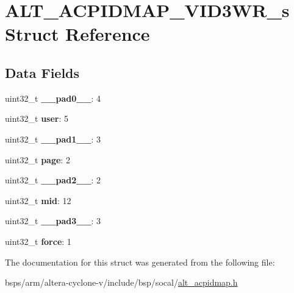 \hypertarget{structALT__ACPIDMAP__VID3WR__s}{}\section{A\+L\+T\+\_\+\+A\+C\+P\+I\+D\+M\+A\+P\+\_\+\+V\+I\+D3\+W\+R\+\_\+s Struct Reference}
\label{structALT__ACPIDMAP__VID3WR__s}
\subsection*{Data Fields}
\begin{DoxyCompactItemize}
\item 
\mbox{\label{structALT__ACPIDMAP__VID3WR__s_ab7fb7b8e96122f83da56fe8c8778306a}} 
uint32\+\_\+t {\bfseries \+\_\+\+\_\+pad0\+\_\+\+\_\+}\+: 4
\item 
\mbox{\label{structALT__ACPIDMAP__VID3WR__s_a0253413ff16c892275b11188e5b7b197}} 
uint32\+\_\+t {\bfseries user}\+: 5
\item 
\mbox{\label{structALT__ACPIDMAP__VID3WR__s_a83d681de9c1321d502ea57e27517a616}} 
uint32\+\_\+t {\bfseries \+\_\+\+\_\+pad1\+\_\+\+\_\+}\+: 3
\item 
\mbox{\label{structALT__ACPIDMAP__VID3WR__s_a7eca5110e2fd4ebc4843ea308a895307}} 
uint32\+\_\+t {\bfseries page}\+: 2
\item 
\mbox{\label{structALT__ACPIDMAP__VID3WR__s_a97bcd883f78f2c5aad835d1e86791a27}} 
uint32\+\_\+t {\bfseries \+\_\+\+\_\+pad2\+\_\+\+\_\+}\+: 2
\item 
\mbox{\label{structALT__ACPIDMAP__VID3WR__s_ae1c18e911039f456640c697192d9db48}} 
uint32\+\_\+t {\bfseries mid}\+: 12
\item 
\mbox{\label{structALT__ACPIDMAP__VID3WR__s_a7baf575463a43a19d6c3d5489f387c34}} 
uint32\+\_\+t {\bfseries \+\_\+\+\_\+pad3\+\_\+\+\_\+}\+: 3
\item 
\mbox{\label{structALT__ACPIDMAP__VID3WR__s_a306623d3042cf19226a25db85bbb5612}} 
uint32\+\_\+t {\bfseries force}\+: 1
\end{DoxyCompactItemize}


The documentation for this struct was generated from the following file\+:\begin{DoxyCompactItemize}
\item 
bsps/arm/altera-\/cyclone-\/v/include/bsp/socal/\mbox{\hyperlink{alt__acpidmap_8h}{alt\+\_\+acpidmap.\+h}}\end{DoxyCompactItemize}
